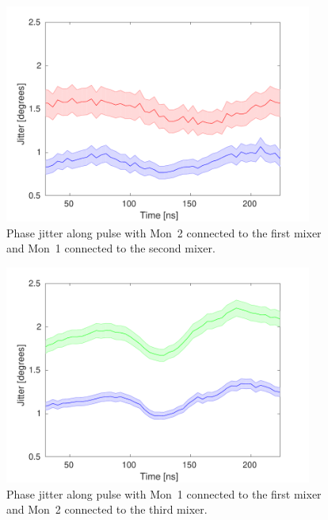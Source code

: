 \begin{figure}
  \centering
  \includegraphics[width=0.9\textwidth]{Figures/phaseMons/Mix1Mon2_Mix2Mon1}
  \caption{Phase jitter along pulse with Mon~2 connected to the first mixer and Mon~1 connected to the second mixer.}
  \label{f:Mix1Mon2_Mix2Mon1}
\end{figure}

\begin{figure}
  \centering
  \includegraphics[width=0.9\textwidth]{Figures/phaseMons/Mix1Mon1_Mix3Mon2}
  \caption{Phase jitter along pulse with Mon~1 connected to the first mixer and Mon~2 connected to the third mixer.}
  \label{f:Mix1Mon1_Mix3Mon2}
\end{figure}

